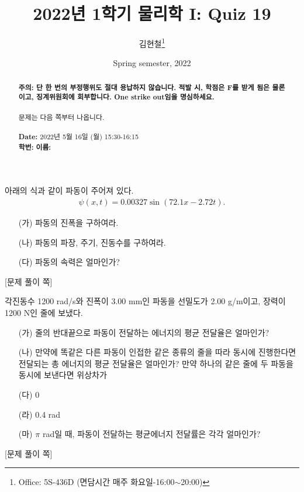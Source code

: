 \documentclass[floatfix,nofootinbib,superscriptaddress,fleqn,preprint]{revtex4-2}
\begin{document}
\title{\Large 2022년 1학기 물리학 I: Quiz 19}
\author{김현철\footnote{Office: 5S-436D (면담시간 매주
    화요일-16:00$\sim$20:00)}} 
\date{Spring semester, 2022}


\vspace{1.cm}
\begin{abstract}
\noindent \textbf{ {\color{red}주의}: \color{blue} 단 한 번의 부정행위도 절대
  용납하지 않습니다. 적발 시, 학점은 F를 받게 됨은 물론이고,
  징계위원회에 회부합니다. One strike out임을 명심하세요.}\\
\\
문제는 다음 쪽부터 나옵니다.  \\ \\
{\bf Date:} 2022년 5월 16일 (월) 15:30-16:15
\\
{\bf 학번:} \hspace{4cm}
{\bf 이름:} 

\end{abstract}
\maketitle

\newpage
{} 
아래의 식과 같이 파동이 주어져 있다. 
\begin{align}
  \label{eq:2}
\psi(x,t) = 0.00327 \sin(72.1x-2.72 t).  
\end{align}
\begin{itemize}
\item[(가)] 파동의 진폭을 구하여라.
\item[(나)] 파동의 파장, 주기, 진동수를 구하여라.
\item[(다)] 파동의 속력은 얼마인가?
\end{itemize}

 \newpage

{\color{gray} [문제 풀이 쪽]}

\newpage

각진동수 1200 rad/s와 진폭이 3.00 mm인 파동을 선밀도가 2.00 g/m이고,
장력이 1200 N인 줄에 보냈다.
\begin{itemize}
\item[(가)] 줄의 반대끝으로 파동이 전달하는 에너지의 평균 전달율은
  얼마인가?
\item[(나)] 만약에 똑같은 다른 파동이 인접한 같은 종류의 줄을 따라
  동시에 진행한다면 전달되는 총 에너지의 평균 전달율은 얼마인가? 만약
  하나의 같은 줄에 두 파동을 동시에 보낸다면 위상차가
\item[(다)] 0
\item[(라)] 0.4 rad
\item[(마)] $\pi$ rad일 때, 파동이 전달하는 평균에너지 전달률은 각각
  얼마인가?   
\end{itemize}
\newpage
{\color{gray} [문제 풀이 쪽]}
\end{document}

